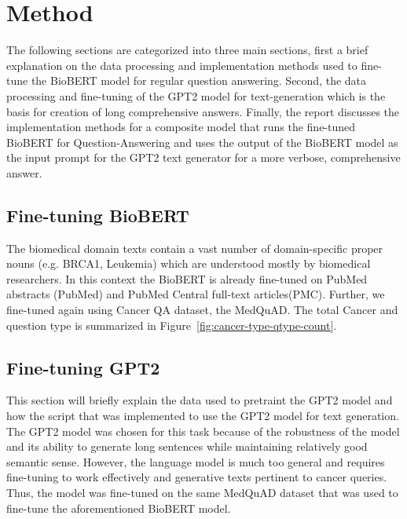 \section*{Method}
	The following sections are categorized into three main sections, first a brief explanation on the data processing and implementation methods used to fine-tune the BioBERT model for regular question answering. Second, the data processing and fine-tuning of the GPT2 model for text-generation which is the basis for creation of long comprehensive answers. Finally, the report discusses the implementation methods for a composite model that runs the fine-tuned BioBERT for Question-Answering and uses the output of the BioBERT model as the input prompt for the GPT2 text generator for a more verbose, comprehensive answer. 
	
	\subsection*{Fine-tuning BioBERT}
		The biomedical domain texts contain a vast number of domain-specific proper nouns (e.g.  BRCA1, Leukemia) which are understood mostly by biomedical researchers. In this context the   BioBERT is already fine-tuned on PubMed abstracts (PubMed) and PubMed Central full-text articles(PMC). Further, we fine-tuned again using Cancer QA dataset, the MedQuAD. The total Cancer and question type is summarized in Figure~\ref{fig:cancer-type-qtype-count}. 
		
	\subsection*{Fine-tuning GPT2}
		This section will briefly explain the data used to pretraint the GPT2 model and how the script that was implemented to use the GPT2 model for text generation. The GPT2 model was chosen for this task because of the robustness of the model and its ability to generate long sentences while maintaining relatively good semantic sense. However, the language model is much too general and requires fine-tuning to work effectively and generative texts pertinent to cancer queries. Thus, the model was fine-tuned on the same MedQuAD dataset that was used to fine-tune the aforementioned BioBERT model.
		
